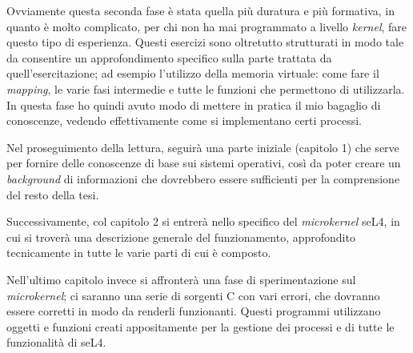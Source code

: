 Ovviamente questa seconda fase è stata quella più duratura e più formativa, in quanto è molto complicato, per chi non ha mai programmato a livello \textit{kernel}, fare questo tipo di esperienza. Questi esercizi sono oltretutto strutturati in modo tale da consentire un approfondimento specifico sulla parte trattata da quell'esercitazione; ad esempio l'utilizzo della memoria virtuale: come fare il \textit{mapping}, le varie fasi intermedie e tutte le funzioni che permettono di utilizzarla. In questa fase ho quindi avuto modo di mettere in pratica il mio bagaglio di conoscenze, vedendo effettivamente come si implementano certi processi.
\newline

Nel proseguimento della lettura, seguirà una parte iniziale (capitolo 1) che serve per fornire delle conoscenze di base sui sistemi operativi, così da poter creare un \textit{background} di informazioni che dovrebbero essere sufficienti per la comprensione del resto della tesi. 

Successivamente, col capitolo 2 si entrerà nello specifico del \textit{microkernel} seL4, in cui si troverà una descrizione generale del funzionamento, approfondito tecnicamente in tutte le varie parti di cui è composto.

Nell'ultimo capitolo invece si affronterà una fase di sperimentazione sul \textit{microkernel}; ci saranno una serie di sorgenti C con vari errori, che dovranno essere corretti in modo da renderli funzionanti. Questi programmi utilizzano oggetti e funzioni creati appositamente per la gestione dei processi e di tutte le funzionalità di seL4. 
